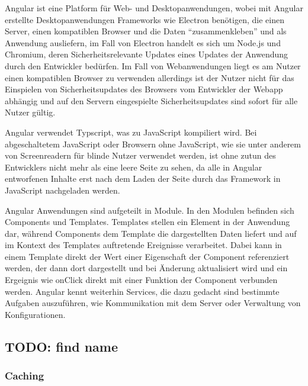 Angular ist eine Platform für Web- und Desktopanwendungen, wobei mit Angular
erstellte Desktopanwendungen Frameworks wie Electron benötigen, die einen
Server, einen kompatiblen Browser und die Daten ``zusammenkleben'' und als
Anwendung ausliefern, im Fall von Electron handelt es sich um Node.js und
Chromium, deren Sicherheitsrelevante Updates eines Updates der Anwendung durch
den Entwickler bedürfen. Im Fall von Webanwendungen liegt es am Nutzer einen
kompatiblen Browser zu verwenden allerdings ist der Nutzer nicht für das
Einspielen von Sicherheitsupdates des Browsers vom Entwickler der Webapp
abhängig und auf den Servern eingespielte Sicherheitsupdates sind sofort für
alle Nutzer gültig.

Angular verwendet Typscript, was zu JavaScript kompiliert wird. Bei
abgeschaltetem JavaScript oder Browsern ohne JavaScript, wie sie unter anderem
von Screenreadern für blinde Nutzer verwendet werden, ist ohne zutun des
Entwicklers nicht mehr als eine leere Seite zu sehen, da alle in Angular
entworfenen Inhalte erst nach dem Laden der Seite durch das Framework in
JavaScript nachgeladen werden.

Angular Anwendungen sind aufgeteilt in Module. In den Modulen befinden sich
Components und Templates. Templates stellen ein Element in der Anwendung dar,
während Components dem Template die dargestellten Daten liefert und auf im
Kontext des Templates auftretende Ereignisse verarbeitet. Dabei kann in einem
Template direkt der Wert einer Eigenschaft der Component referenziert werden,
der dann dort dargestellt und bei Änderung aktualisiert wird und ein Ergeignis
wie onClick direkt mit einer Funktion der Component verbunden werden. Angular
kennt weiterhin Services, die dazu gedacht sind bestimmte Aufgaben auszuführen,
wie Kommunikation mit dem Server oder Verwaltung von Konfigurationen.


\subsection{TODO: find name}


\subsubsection{Caching}

